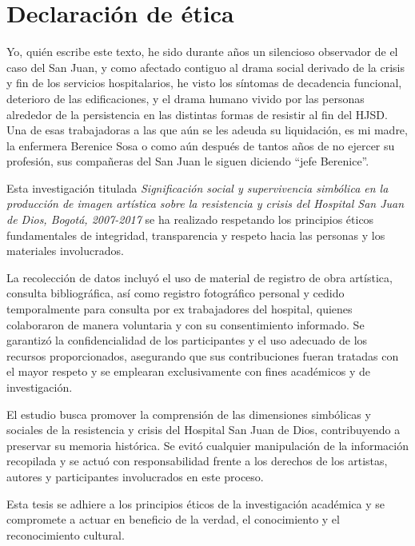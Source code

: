 \section*{Declaración de ética}
\setlength{\parskip}{1em}

Yo, quién escribe este texto, he sido durante años un silencioso observador de el caso del San Juan, y como afectado contiguo al drama social derivado de la crisis y fin de los servicios hospitalarios, he visto los síntomas de decadencia funcional, deterioro de las edificaciones, y el drama humano vivido por las personas alrededor de la persistencia en las distintas formas de resistir al fin del HJSD. Una de esas trabajadoras a las que aún se les adeuda su liquidación, es mi madre, la enfermera Berenice Sosa o como aún después de tantos años de no ejercer su profesión, sus compañeras del San Juan le siguen diciendo “jefe Berenice”.

Esta investigación titulada \textit{Significación social y supervivencia simbólica en la producción de imagen artística sobre la resistencia y crisis del Hospital San Juan de Dios, Bogotá, 2007-2017} se ha realizado respetando los principios éticos fundamentales de integridad, transparencia y respeto hacia las personas y los materiales involucrados.  

La recolección de datos incluyó el uso de material de registro de obra artística, consulta bibliográfica, así como registro fotográfico personal y cedido temporalmente para consulta por ex trabajadores del hospital, quienes colaboraron de manera voluntaria y con su consentimiento informado. Se garantizó la confidencialidad de los participantes y el uso adecuado de los recursos proporcionados, asegurando que sus contribuciones fueran tratadas con el mayor respeto y se emplearan exclusivamente con fines académicos y de investigación.  

El estudio busca promover la comprensión de las dimensiones simbólicas y sociales de la resistencia y crisis del Hospital San Juan de Dios, contribuyendo a preservar su memoria histórica. Se evitó cualquier manipulación de la información recopilada y se actuó con responsabilidad frente a los derechos de los artistas, autores y participantes involucrados en este proceso.  

Esta tesis se adhiere a los principios éticos de la investigación académica y se compromete a actuar en beneficio de la verdad, el conocimiento y el reconocimiento cultural. 
\pagebreak